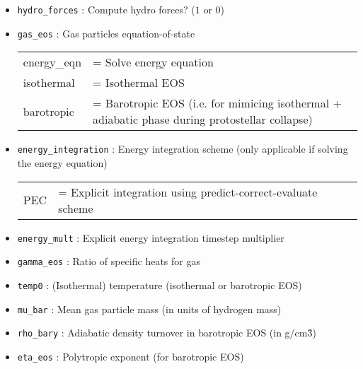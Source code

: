 \documentclass[a4paper]{article}
\newcommand{\var}[1]{\texttt{#1}}
\begin{document}
\begin{itemize}
\item \var{hydro\_forces} : Compute hydro forces?  ($1$ or $0$)

\item \var{gas\_eos} : Gas particles equation-of-state \\
\begin{tabular}{ll}
energy\_eqn & = Solve energy equation \\
isothermal  & = Isothermal EOS \\
barotropic  & = Barotropic EOS (i.e. for mimicing isothermal + adiabatic phase during protostellar collapse)
\end{tabular}


\item \var{energy\_integration} : Energy integration scheme (only applicable if solving the energy equation) \\
\begin{tabular}{ll}
PEC         & = Explicit integration using predict-correct-evaluate scheme
\end{tabular}

\item \var{energy\_mult} : Explicit energy integration timestep multiplier

\item \var{gamma\_eos} : Ratio of specific heats for gas

\item \var{temp0} : (Isothermal) temperature (isothermal or barotropic EOS)

\item \var{mu\_bar}    : Mean gas particle mass (in units of hydrogen mass)

\item \var{rho\_bary} : Adiabatic density turnover in barotropic EOS (in g/cm\^3)

\item \var{eta\_eos}   : Polytropic exponent (for barotropic EOS)



\end{itemize}
\end{document}
